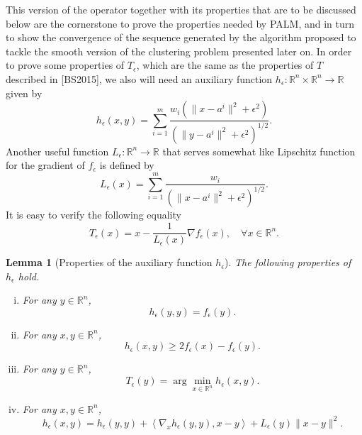 \documentclass[11pt]{article}
\numberwithin{equation}{section}
\newtheorem{lemma}{Lemma}[proposition]
\begin{document}
This version of the operator together with its properties that are to be discussed below are the cornerstone to prove the properties needed by PALM, and in turn to show the convergence of the sequence generated by the algorithm proposed to tackle the smooth version of the clustering problem presented later on.
In order to prove some properties of $T_{\epsilon}$, which are the same as the properties of $T$ described in [BS2015], we also will need an auxiliary function $h_{\epsilon}: \mathbb{R}^n \times \mathbb{R}^n \rightarrow \mathbb{R}$ given by
\begin{equation*}
	h_{\epsilon}(x,y) = \sum\limits_{i=1}^m \frac{w_i \left( \|x-a^i\|^2 + {\epsilon}^2 \right)}{\left( \|y-a^i\|^2 + {\epsilon}^2 \right)^{1/2}} .
\end{equation*}
Another useful function $L_{\epsilon}: \mathbb{R}^n \rightarrow \mathbb{R}$ that serves somewhat like Lipschitz function for the gradient of $f_{\epsilon}$ is defined by
\begin{equation*}
	L_{\epsilon}(x) = \sum\limits_{i=1}^{m}\frac{w_i}{\left( \|x - a^i\|^2 + {\epsilon}^2 \right)^{1/2}} .
\end{equation*}
It is easy to verify the following equality
\begin{equation}
	T_{\epsilon}(x) = x - \frac{1}{L_{\epsilon}(x)}\nabla f_{\epsilon}(x) , \quad \forall x \in \mathbb{R}^n . \label{StateEq62}
\end{equation}

\begin{lemma} [Properties of the auxiliary function $h_{\epsilon}$]\label{StateEq63}
The following properties of $h_{\epsilon}$ hold.
\begin{enumerate}[(i)]
	\item For any $y \in \mathbb{R}^n$,
	\begin{equation*}
		h_{\epsilon}(y,y) = f_{\epsilon}(y) .
	\end{equation*}
	\item For any $x,y \in \mathbb{R}^n$,
	\begin{equation*}
		h_{\epsilon}(x,y) \geq 2f_{\epsilon}(x) - f_{\epsilon}(y) .
	\end{equation*}
	\item For any $y \in \mathbb{R}^n$,
	\begin{equation*}
	 	T_{\epsilon}(y) = \arg\!\min_{x \in \mathbb{R}^n} h_{\epsilon}(x,y) .
	 \end{equation*}
	\item For any $x,y \in \mathbb{R}^n$,
	\begin{equation*}
		h_{\epsilon}(x,y) = h_{\epsilon}(y,y) + \left\langle \nabla_x h_{\epsilon}(y,y) , x-y \right\rangle + L_{\epsilon}(y) \|x-y\|^2 .
	\end{equation*}
\end{enumerate}
\end{lemma}
\end{document}

